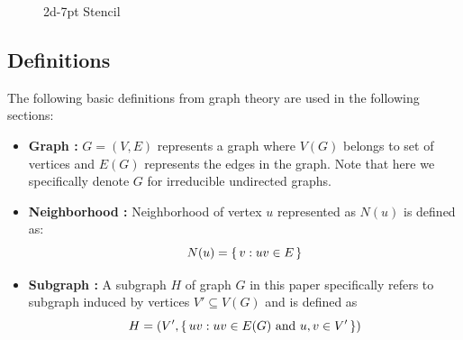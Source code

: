 \begin{figure}[tbhp]
	\centering
	\hspace{1.5em}
	\caption{2d-7pt Stencil}
	\label{fig:2d-7pt}
\end{figure}

\subsection*{Definitions}
The following basic definitions from graph theory are used in the following sections:
\begin{itemize}
	\item \textbf{Graph : } $G = (V,E)$ represents a graph where $V(G)$ belongs to set of vertices and $E(G)$ represents the edges in the graph. Note that here we specifically denote $G$ for irreducible undirected graphs.
	\item \textbf{Neighborhood :} Neighborhood of vertex $u$ represented as $N(u)$ is defined as:
	\begin{equation*}
	  N(u) = \set{ v : uv \in E}
	\end{equation*}
	\item \textbf{Subgraph :} A subgraph $H$ of graph $G$ in this paper specifically refers to subgraph induced by vertices $V' \subseteq V(G)$ and is defined as
	\begin{equation*}
		H = (V', \set{ uv : uv \in E(G) \text{ and } u,v \in V'})
	\end{equation*}
\end{itemize}

